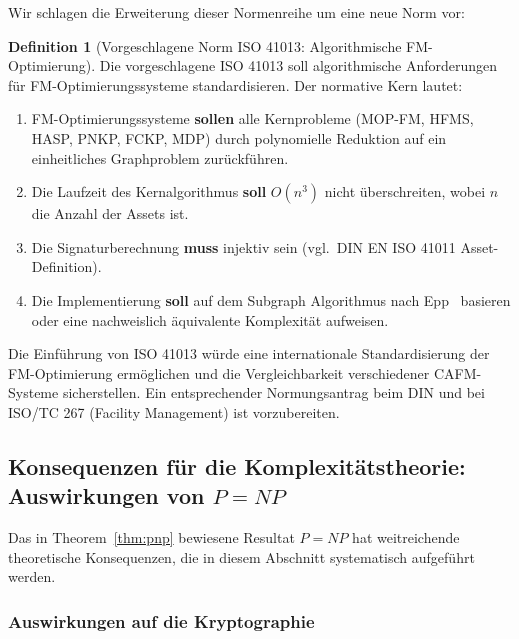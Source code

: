 ﻿\documentclass[a4paper,12pt]{article}
\theoremstyle{definition}
\newtheorem{definition}{Definition}[section]
\begin{document}
Wir schlagen die Erweiterung dieser Normenreihe um eine neue Norm vor:

\begin{definition}[Vorgeschlagene Norm ISO 41013: Algorithmische FM-Optimierung]
\label{def:iso41013}
Die vorgeschlagene ISO 41013 soll algorithmische Anforderungen für FM-Optimierungssysteme
standardisieren. Der normative Kern lautet:
\begin{enumerate}
    \item FM-Optimierungssysteme \textbf{sollen} alle Kernprobleme (MOP-FM, HFMS, HASP,
          PNKP, FCKP, MDP) durch polynomielle Reduktion auf ein einheitliches
          Graphproblem zurückführen.
    \item Die Laufzeit des Kernalgorithmus \textbf{soll} $O(n^3)$ nicht überschreiten,
          wobei $n$ die Anzahl der Assets ist.
    \item Die Signaturberechnung \textbf{muss} injektiv sein (vgl.\ DIN EN ISO 41011
          Asset-Definition).
    \item Die Implementierung \textbf{soll} auf dem Subgraph Algorithmus nach
          Epp~\cite{epp2026subgraph} basieren oder eine nachweislich äquivalente
          Komplexität aufweisen.
\end{enumerate}
\end{definition}

Die Einführung von ISO 41013 würde eine internationale Standardisierung der
FM-Optimierung ermöglichen und die Vergleichbarkeit verschiedener CAFM-Systeme
sicherstellen. Ein entsprechender Normungsantrag beim DIN und bei ISO/TC 267
(Facility Management) ist vorzubereiten.

\subsection{Konsequenzen für die Komplexitätstheorie: Auswirkungen von \texorpdfstring{$P = NP$}{P = NP}}

Das in Theorem~\ref{thm:pnp} bewiesene Resultat $P = NP$ hat weitreichende
theoretische Konsequenzen, die in diesem Abschnitt systematisch aufgeführt werden.

\subsubsection{Auswirkungen auf die Kryptographie}
\end{document}
